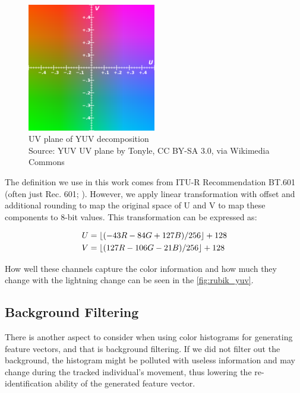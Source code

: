 \begin{figure}
    \centering
    \includegraphics[width=5.6cm]{img/YUV_UV_plane.svg.png}
    \caption[UV plane of YUV decomposition]{UV plane of YUV decomposition\\
    Source: YUV UV plane\protect\footnotemark{} by Tonyle, CC BY-SA 3.0, via Wikimedia Commons \protect\footnotemark{}}
    \label{fig:yuv_decomposition}
\end{figure}
\addtocounter{footnote}{-2}

The definition we use in this work comes from ITU-R Recommendation BT.601
(often just Rec. 601; \cite{bt2011studio}). However, we apply linear
transformation with offset and additional rounding to map the original space of U and V
to map these components to 8-bit values. This transformation can be expressed
as:

\begin{align*}
U &= \lfloor(-43R - 84G + 127B) / 256\rfloor + 128 \\
V &= \lfloor(127R - 106G - 21B) / 256\rfloor + 128
\end{align*}

How well these channels capture the color information and how much they change with the lightning change can be seen in the \autoref{fig:rubik_yuv}.

\subsection{Background Filtering}

There is another aspect to consider when using color histograms for generating feature vectors, and that is background filtering. If we did not filter out the background, the histogram might be polluted with useless information and may change during the tracked individual's movement, thus lowering the re-identification ability of the generated feature vector.

